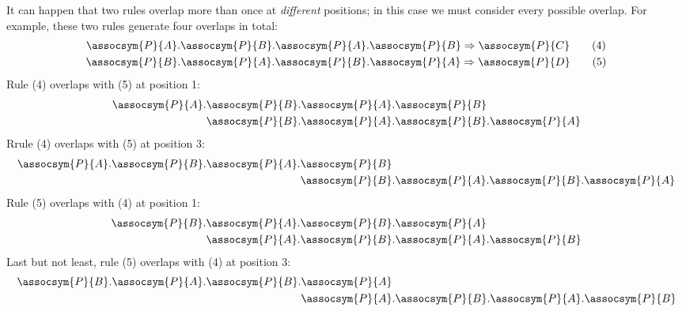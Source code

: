 \documentclass[../generics]{subfiles}
\begin{document}
\begin{example}
It can happen that two rules overlap more than once at \emph{different} positions; in this case we must consider every possible overlap. For example, these two rules generate four overlaps in total:
\begin{gather*}
\assocsym{P}{A}.\assocsym{P}{B}.\assocsym{P}{A}.\assocsym{P}{B}\Rightarrow \assocsym{P}{C}\tag{4}\\
\assocsym{P}{B}.\assocsym{P}{A}.\assocsym{P}{B}.\assocsym{P}{A}\Rightarrow \assocsym{P}{D}\tag{5}
\end{gather*}
Rule (4) overlaps with (5) at position 1:
\begin{align*}
\assocsym{P}{A}.&\assocsym{P}{B}.\assocsym{P}{A}.\assocsym{P}{B}\\
&\assocsym{P}{B}.\assocsym{P}{A}.\assocsym{P}{B}.\assocsym{P}{A}
\end{align*}
Rrule (4) overlaps with (5) at position 3:
\begin{align*}
\assocsym{P}{A}.\assocsym{P}{B}.\assocsym{P}{A}.&\assocsym{P}{B}\\
&\assocsym{P}{B}.\assocsym{P}{A}.\assocsym{P}{B}.\assocsym{P}{A}
\end{align*}
Rule (5) overlaps with (4) at position 1:
\begin{align*}
\assocsym{P}{B}.&\assocsym{P}{A}.\assocsym{P}{B}.\assocsym{P}{A}\\
&\assocsym{P}{A}.\assocsym{P}{B}.\assocsym{P}{A}.\assocsym{P}{B}
\end{align*}
Last but not least, rule (5) overlaps with (4) at position 3:
\begin{align*}
\assocsym{P}{B}.\assocsym{P}{A}.\assocsym{P}{B}.&\assocsym{P}{A}\\
&\assocsym{P}{A}.\assocsym{P}{B}.\assocsym{P}{A}.\assocsym{P}{B}
\end{align*}
\end{example}
\end{document}
